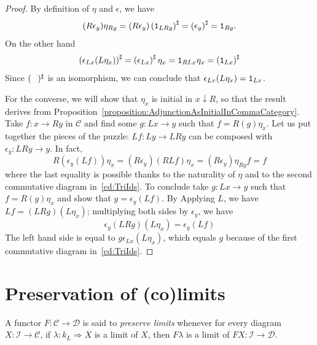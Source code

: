 \begin{proof}
  By definition of \(\eta\) and \(\epsilon\), we have
  \[
    (R\epsilon_y) \eta_{Ry} = (R\epsilon_y) \left( \mathtt 1_{LRy} \right)^\sharp = \left( \epsilon_y
    \right)^\sharp = \mathtt 1_{Ry} .
  \]
  On the other hand
  \[
    \left( \epsilon_{Lx} (L\eta_x) \right)^\sharp = \left( \epsilon_{Lx} \right)^\sharp \eta_x =
    \mathtt 1_{RLx} \eta_x = \left(\mathtt 1_{Lx}\right)^\sharp
  \]
  Since \((\hole)^\sharp\) is an isomorphism, we can conclude that
  \(\epsilon_{Lx} (L\eta_x) = \mathtt 1_{Lx}\).

  For the converse, we will show that \(\eta_x\) is initial in
  \(x{\downarrow}R\), so that the result derives from
  Proposition~\ref{proposition:AdjunctionAsInitialInCommaCategory}. Take
  \(f : x \to Ry\) in \(\mathcal{C}\) and find some \(g : Lx \to y\) such that
  \(f = R(g) \eta_x\). Let us put together the pieces of the puzzle:
  \(Lf : Ly \to LRy\) can be composed with \(\epsilon_y : LRy \to y\). In fact,
  \[
    R(\epsilon_y (Lf)) \eta_x = (R\epsilon_y) (RLf) \eta_x = (R\epsilon_y) \eta_{Ry} f = f
  \]
  where the last equality is possible thanks to the naturality of
  \(\eta\) and to the second commutative diagram in~\eqref{cd:TriIds}. To
  conclude take \(g : Lx \to y\) such that \(f = R(g) \eta_x\) and show that
  \(g = \epsilon_y (Lf)\). By Applying \(L\), we have \(Lf = (LRg) (L\eta_x)\);
  multiplying both sides by \(\epsilon_y\), we have
  \[
    \epsilon_y (LRg) (L\eta_x) = \epsilon_y (Lf)
  \]
  The left hand side is equal to \(g \epsilon_{Lx} (L\eta_x)\), which equals \(g\)
  because of the first commutative diagram in~\eqref{cd:TriIds}. 
\end{proof}



\section{Preservation of (co)limits}

\begin{definition}
  A functor \(F : \mathcal{C} \to \mathcal{D}\) is said to {\em preserve limits}
  whenever for every diagram \(X : \mathcal{I} \to \mathcal{C}\), if
  \(\lambda : k_L \Rightarrow X\) is a limit of \(X\), then \(F\lambda\) is a limit of
  \(FX : \mathcal{I} \to \mathcal{D}\).
\end{definition}

